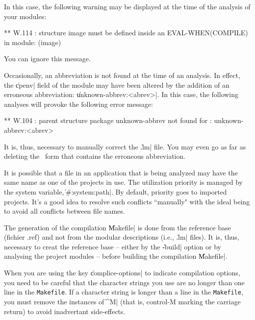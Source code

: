 In this case, the following warning may be displayed at the time of the analysis of your modules:

\begin{Longcode*}
** W.114 :
structure image must be defined inside an EVAL-WHEN(COMPILE) in module:
(image)
\end{Longcode*}

You can ignore this message.


Occasionally, an abbreviation is not found at the time of an analysis.
In effect, the \|cpenv| field of the module may have been altered by the addition of an erroneous abbreviation:  \|{unknown-abbrev}:<abrev>|.  In this case, the following analyses will provoke the following error message: 

\begin{Code*}
** W.104 : parent structure package unknown-abbrev not found for : {
unknown-abbrev}:<abrev>
\end{Code*}

It is, thus, necessary to manually correct the \|.lm| file.  You may even go as far as deleting the \LeLisp\ form that contains the erroneous abbreviation.


It is possible that a file in an application that is being analyzed may
have the same name as one of the projects in use.  The utilization priority 
is managed by the system variable, \|#:system:path|.  By default, priority
goes to imported projects.  It's a good idea to resolve such conflicts
``manually" with the ideal being to avoid all conflicts between file names.


The generation of the compilation \|Makefile| is done from the reference base (fichier .ref) and not from the modular descriptions (i.e., \|.lm| files).  It is, thus, necessary to creat the reference base -- either by the \|-build| option or by analysing the project modules -- before building the compilation \|Makefile|.

When you are using the key \|complice-options| to indicate compilation options, 
you need to be careful that the character strings
you use are no longer than one line in the {\tt Makefile}. If a
character string is longer than a line in the {\tt Makefile}, you
must remove the instances of \|^M| (that is, {\sc control-M} marking the
carriage return) to avoid inadvertant side-effects.

